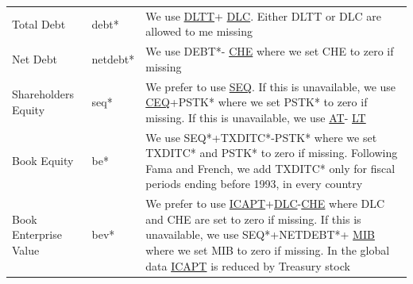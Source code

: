 \documentclass[12pt,title,fleqn]{article}
\begin{document}
{\begin{longtable}{@{\extracolsep{\fill}}|m{5cm}|l|m{8cm}|@{}}
	Total Debt & debt\mbox{*} & We use 
	\href{https://wrds-www.wharton.upenn.edu/data-dictionary/form_metadata/comp_na_daily_all_funda_balancesheetitems/DLTT/}{DLTT}+
	\href{https://wrds-www.wharton.upenn.edu/data-dictionary/form_metadata/comp_na_daily_all_funda_balancesheetitems/DLC/}{DLC}. Either DLTT or DLC are allowed to me missing\\
	
	Net Debt & netdebt\mbox{*} & We use DEBT\mbox{*}-
	\href{https://wrds-www.wharton.upenn.edu/data-dictionary/form_metadata/comp_na_daily_all_funda_balancesheetitems/CHE/}{CHE} where we set CHE to zero if missing \\
	
	Shareholders Equity & seq\mbox{*} & We prefer to use 
	\href{https://wrds-www.wharton.upenn.edu/data-dictionary/form_metadata/comp_na_daily_all_funda_balancesheetitems/SEQ/}{SEQ}. If this is unavailable, we use 
	\href{https://wrds-www.wharton.upenn.edu/data-dictionary/form_metadata/comp_na_daily_all_funda_balancesheetitems/CEQ/}{CEQ}+PSTK\mbox{*} where we set PSTK\mbox{*} to zero if missing. If this is unavailable, we use 
	\href{https://wrds-www.wharton.upenn.edu/data-dictionary/form_metadata/comp_na_daily_all_funda_balancesheetitems/AT/}{AT}-
	\href{https://wrds-www.wharton.upenn.edu/data-dictionary/form_metadata/comp_na_daily_all_funda_balancesheetitems/LT/}{LT} \\
	
	Book Equity & be\mbox{*} & We use SEQ\mbox{*}+TXDITC\mbox{*}-PSTK\mbox{*} where we set TXDITC\mbox{*} and PSTK\mbox{*} to zero if missing. Following Fama and French, we add TXDITC\mbox{*} only for fiscal periods ending before 1993, in every country \\
	
	Book Enterprise Value & bev\mbox{*} & We prefer to use 
	\href{https://wrds-www.wharton.upenn.edu/data-dictionary/form_metadata/comp_na_daily_all_funda_balancesheetitems/ICAPT/}{ICAPT}+\href{https://wrds-www.wharton.upenn.edu/data-dictionary/form_metadata/comp_na_daily_all_funda_balancesheetitems/DLC/}{DLC}-\href{https://wrds-www.wharton.upenn.edu/data-dictionary/form_metadata/comp_na_daily_all_funda_balancesheetitems/CHE/}{CHE} where DLC and CHE are set to zero if missing. If this is unavailable, we use SEQ\mbox{*}+NETDEBT\mbox{*}+
	\href{https://wrds-www.wharton.upenn.edu/data-dictionary/form_metadata/comp_na_daily_all_funda_balancesheetitems/MIB/}{MIB} where we set MIB to zero if missing. In the global data \href{https://wrds-www.wharton.upenn.edu/data-dictionary/form_metadata/comp_na_daily_all_funda_balancesheetitems/ICAPT/}{ICAPT} is reduced by Treasury stock \\
	

\end{longtable}}
\end{document}
